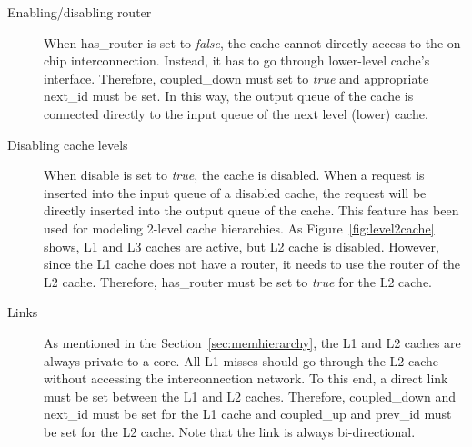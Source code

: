 \begin{description}
  \item[Enabling/disabling router] When \textsf{has\_router} is set to \textit{false},
  the cache cannot directly access to the on-chip
  interconnection. Instead, it has to go through lower-level cache's
  interface. Therefore, \textsf{coupled\_down} must set
  to \textit{true} and appropriate \textsf{next\_id} must be set. In
  this way, the output queue of the cache is connected directly to the
  input queue of the next level (lower) cache.

  \item[Disabling cache levels] When \textsf{disable} is set to \textit{true},
  the cache is disabled. When a request is inserted into the input queue of a
  disabled cache, the request will be directly inserted into the output queue
  of the cache. This feature has been used for modeling 2-level cache
  hierarchies. As Figure~\ref{fig:level2cache} shows, L1 and L3 caches are
  active, but L2 cache is disabled. However, since the L1 cache does not have a
  router, it needs to use the router of the L2 cache. Therefore,
  \textsf{has\_router} must be set to \textit{true} for the L2 cache.

  \item[Links] As mentioned in the Section~\ref{sec:memhierarchy}, the
  L1 and L2 caches are always private to a core. All L1 misses
  should go through the L2 cache without accessing the interconnection
  network. To this end, a direct link must be set between the L1 and
  L2 caches. Therefore, \textsf{coupled\_down} and \textsf{next\_id}
  must be set for the L1 cache and \textsf{coupled\_up}
  and \textsf{prev\_id} must be set for the L2 cache. Note that the
  link is always bi-directional.

\end{description}

